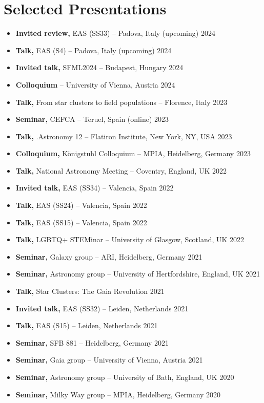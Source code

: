 \section*{Selected Presentations}

\begin{itemize}
    \item \textbf{Invited review,} EAS (SS33) -- Padova, Italy \hfill (upcoming) 2024
    \item \textbf{Talk,} EAS (S4) -- Padova, Italy \hfill (upcoming) 2024
    \item \textbf{Invited talk,} SFML2024 -- Budapest, Hungary \hfill 2024
    \item \textbf{Colloquium}  -- University of Vienna, Austria \hfill 2024
    \item \textbf{Talk,} From star clusters to field populations -- Florence, Italy \hfill 2023
    \item \textbf{Seminar,} CEFCA -- Teruel, Spain (online) \hfill 2023
    \item \textbf{Talk,} .Astronomy 12 -- Flatiron Institute, New York, NY, USA \hfill 2023
    \item \textbf{Colloquium,} Königstuhl Colloquium -- MPIA, Heidelberg, Germany \hfill 2023
    \item \textbf{Talk,} National Astronomy Meeting -- Coventry, England, UK \hfill 2022
    \item \textbf{Invited talk,} EAS (SS34) -- Valencia, Spain \hfill 2022
    \item \textbf{Talk,} EAS (SS24) -- Valencia, Spain \hfill 2022
    \item \textbf{Talk,} EAS (SS15) -- Valencia, Spain \hfill 2022
    \item \textbf{Talk,} LGBTQ+ STEMinar  -- University of Glasgow, Scotland, UK \hfill 2022
    \item \textbf{Seminar,} Galaxy group -- ARI, Heidelberg, Germany \hfill 2021
    \item \textbf{Seminar,} Astronomy group -- University of Hertfordshire, England, UK \hfill 2021
    \item \textbf{Talk,} Star Clusters: The Gaia Revolution \hfill 2021
    \item \textbf{Invited talk,} EAS (SS32) -- Leiden, Netherlands \hfill 2021
    \item \textbf{Talk,} EAS (S15) -- Leiden, Netherlands \hfill 2021
    \item \textbf{Seminar,} SFB 881 -- Heidelberg, Germany \hfill 2021
    \item \textbf{Seminar,} Gaia group -- University of Vienna, Austria \hfill 2021
    \item \textbf{Seminar,} Astronomy group -- University of Bath, England, UK \hfill 2020
    \item \textbf{Seminar,} Milky Way group -- MPIA, Heidelberg, Germany \hfill 2020
\end{itemize}